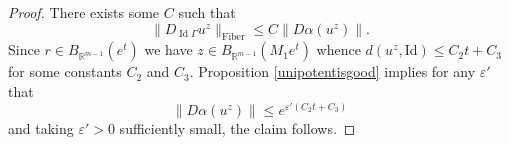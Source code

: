 \documentclass[10pt,reqno]{amsart}
\theoremstyle{Theorem}
\theoremstyle{definition}
\theoremstyle{remark}
\renewcommand{\epsilon}{\varepsilon}
\newcommand{\td}{\tilde}
\def\Fib{\mathrm{Fiber}}
\DeclareMathOperator{\Id}{Id}
\newcommand{\R}{\mathbb {R}}
\newcommand{\Z}{\mathbb {Z}}
\newcommand{\e}{\epsilon}
\newcommand{\Sl}{\mathrm{SL}}
\newcommand{\id}{\mathrm{Id}}
\begin{document}
{\begin{proof}
There exists some $C$ such that
$$\| D_{\Id \Gamma} u^z\| _{\Fib}\le C \|D\alpha(u^z)\| .$$
Since $r\in B_{\R^{m-1}}(e^t)$ we  have $z\in B_{\R^{m-1}} (M_1 e ^t)$ whence $d(u^z,\id)\le C_2 t + C_3$ for some constants $C_2$ and $C_3$.
  Proposition \ref{unipotentisgood} implies for any $\e'$ that   $$\|D\alpha(u^z)\|  \leq e^{\e'  (C_2 t + C_3)}$$
and taking $\e'>0$ sufficiently small, the claim follows.
%
%
%
%
%
%

\end{proof}}
\end{document}
